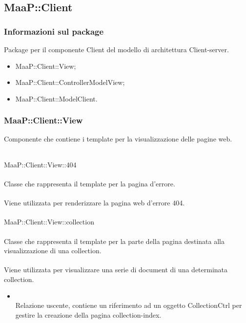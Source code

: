 \subsection{MaaP::Client}
\subsubsection{Informazioni sul package}
Package per il componente Client del modello di architettura Client-server.
\begin{itemize}
\item MaaP::Client::View;
\item MaaP::Client::ControllerModelView;
\item MaaP::Client::ModelClient.
\end{itemize}

\subsubsection{MaaP::Client::View}
Componente che contiene i template per la visualizzazione delle pagine web.

\\
MaaP::Client::View::404\\
\\
Classe che rappresenta il template per la pagina d'errore.\\
\\
Viene utilizzata per renderizzare la pagina web d'errore 404.\\

\\
MaaP::Client::View::collection\\
\\
Classe che rappresenta il template per la parte della pagina destinata alla visualizzazione di una collection.\\
\\
Viene utilizzata per visualizzare una serie di document di una determinata collection.\\
\begin{itemize}
\item{}\\
Relazione uscente, contiene un riferimento ad un oggetto CollectionCtrl per gestire la creazione della pagina collection-index.
\end{itemize}

